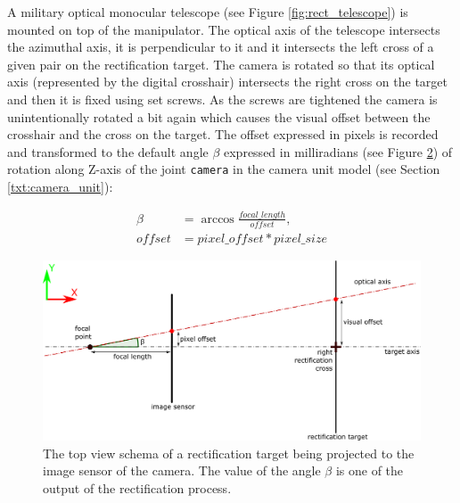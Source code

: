\begin{figure}[htb]
\begin{minipage}{.59\textwidth}
		\label{fig:rect_azi_axis}
	\end{minipage}
\end{figure}

A military optical monocular telescope (see Figure \ref{fig:rect_telescope}) is mounted on top of the manipulator. The optical axis of the telescope intersects the azimuthal axis, it is perpendicular to it and it intersects the left cross of a given pair on the rectification target. The camera is rotated so that its optical axis (represented by the digital crosshair) intersects the right cross on the target and then it is fixed using set screws. As the screws are tightened the camera is unintentionally rotated a bit again which causes the visual offset between the crosshair and the cross on the target. The offset expressed in pixels is recorded and transformed to the default angle $\beta$ expressed in milliradians (see Figure \ref{fig:rect_pixel_offset}) of rotation along Z-axis of the joint \texttt{camera} in the camera unit model (see Section \ref{txt:camera_unit}):

\begin{equation*}
\begin{aligned}
\beta &= \arccos\frac{focal\_length}{offset}, \\
offset &= pixel\_offset * pixel\_size
\end{aligned}
\end{equation*}

\begin{figure}[htb]
	\centering
	\includegraphics[width=13cm]{fig/rect_pixel_offset.pdf}
	\caption{The top view schema of a rectification target being projected to the image sensor of the camera. The value of the angle $\beta$ is one of the output of the rectification process.}
	\label{fig:rect_pixel_offset}
\end{figure}


